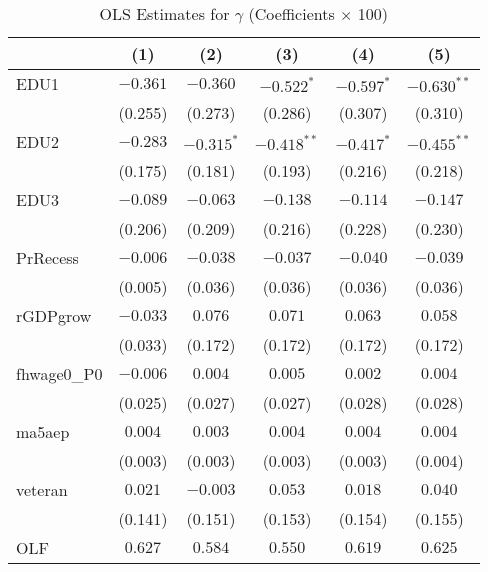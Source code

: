 \documentclass[12pt]{article}
\begin{document}
\begin{table}[H]
\centering
\caption{OLS Estimates for $\gamma$ (Coefficients $\times$ 100)}

\begin{tabular}{lccccc}

\toprule
                    & (1)     & (2)   & (3)    & (4)      & (5)         \\
\midrule
EDU1                & $-0.361$  & $-0.360$    & $-0.522^{*}$  & $-0.597^{*}$   & $-0.630^{**}$    \\
                    & (0.255)   & (0.273)     & (0.286)   & (0.307)    & (0.310)     \\
EDU2                & $-0.283$  & $-0.315^{*}$    & $-0.418^{**}$  & $-0.417^{*}$   & $-0.455^{**}$    \\
                    & (0.175)   & (0.181)     & (0.193)   & (0.216)    & (0.218)     \\
EDU3                & $-0.089$  & $-0.063$    & $-0.138$  & $-0.114$   & $-0.147$    \\
                    & (0.206)   & (0.209)     & (0.216)   & (0.228)    & (0.230)     \\
PrRecess            & $-0.006$   & $-0.038$     & $-0.037$   & $-0.040$    & $-0.039$     \\
                    & (0.005)   & (0.036)     & (0.036)   & (0.036)    & (0.036)     \\
rGDPgrow            & $-0.033$   & $0.076$     & $0.071$   & $0.063$    & $0.058$     \\
                    & (0.033)   & (0.172)     & (0.172)   & (0.172)    & (0.172)     \\
fhwage0\_P0         & $-0.006$   & $0.004$     & $0.005$   & $0.002$    & $0.004$     \\
                    & (0.025)   & (0.027)     & (0.027)   & (0.028)    & (0.028)     \\
ma5aep              & $0.004$   & $0.003$     & $0.004$   & $0.004$    & $0.004$     \\
                    & (0.003)   & (0.003)     & (0.003)   & (0.003)    & (0.004)     \\
veteran             & $0.021$   & $-0.003$     & $0.053$   & $0.018$    & $0.040$     \\
                    & (0.141)   & (0.151)     & (0.153)   & (0.154)    & (0.155)     \\
OLF                 & $0.627$   & $0.584$     & $0.550$   & $0.619$    & $0.625$     \\

\end{tabular}
\end{table}
\end{document}
